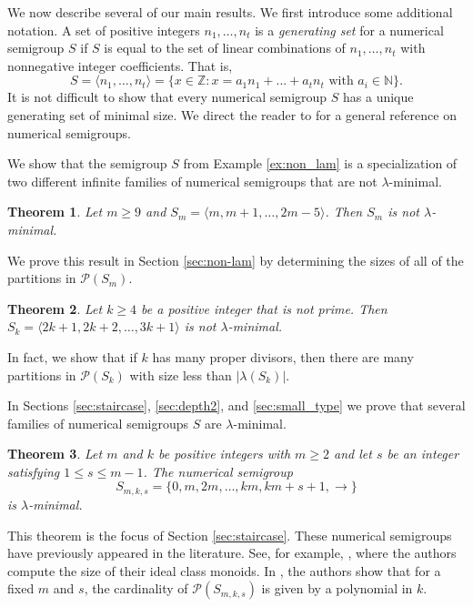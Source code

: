 \documentclass{amsproc}
\newcommand{\N}{\mathbb{N}}
\newtheorem{theorem}{Theorem}[section]
\theoremstyle{definition}
\theoremstyle{remark}
\numberwithin{equation}{section}
\begin{document}
We now describe several of our main results.  We first introduce some additional notation.  A set of positive integers $n_1,\ldots, n_t$ is a \emph{generating set} for a numerical semigroup $S$ if $S$ is equal to the set of linear combinations of $n_1,\ldots, n_t$ with nonnegative integer coefficients.  That is, 
\[
S = \langle n_1,\ldots, n_t \rangle= \{x\in \mathbb{Z} \colon x = a_{1}n_{1}+ ... + a_{t}n_{t} \text{ with } a_{i} \in \N\}.
\]
It is not difficult to show that every numerical semigroup $S$ has a unique generating set of minimal size.  We direct the reader to \cite{rosales_numerical_2009} for a general reference on numerical semigroups. 


We show that the semigroup $S$ from Example \ref{ex:non_lam} is a specialization of two different infinite families of numerical semigroups that are not $\lambda$-minimal.
\begin{theorem}\label{thm:inf_non_lam}
Let $m \ge 9$ and $S_{m} = \langle m, m+1,\ldots, 2m-5\rangle$.  Then $S_m$ is not $\lambda$-minimal.
\end{theorem}
We prove this result in Section \ref{sec:non-lam} by determining the sizes of all of the partitions in $\mathcal{P}(S_m)$.

\begin{theorem}\label{thm:2k1_3k1_intro}
Let $k \ge 4$ be a positive integer that is not prime.  Then $S_k = \langle 2k+1, 2k+2, \ldots, 3k+1\rangle$ is not $\lambda$-minimal.
\end{theorem}
In fact, we show that if $k$ has many proper divisors, then there are many partitions in $\mathcal{P}(S_k)$ with size less than $|\lambda(S_k)|$.


In Sections \ref{sec:staircase}, \ref{sec:depth2}, and \ref{sec:small_type} we prove that several families of numerical semigroups $S$ are $\lambda$-minimal.  
\begin{theorem}\label{thm:staircase}
Let $m$ and $k$ be positive integers with $m \ge 2$ and let $s$ be an integer satisfying $1 \le s \le m-1$. The numerical semigroup
\[
S_{m,k,s} = \{0,m,2m, \ldots, km, km+s+1, \rightarrow \}
\]
is $\lambda$-minimal.
\end{theorem}
This theorem is the focus of Section \ref{sec:staircase}. 
These numerical semigroups have previously appeared in the literature.  See, for example, \cite[Corollary 4.5]{casabella2024apery}, where the authors compute the size of their ideal class monoids. In \cite{ChenAsymptoticGrowth}, the authors show that for a fixed $m$ and $s$, the cardinality of $\mathcal{P}(S_{m,k,s})$ is given by a polynomial in $k$.
\end{document}
